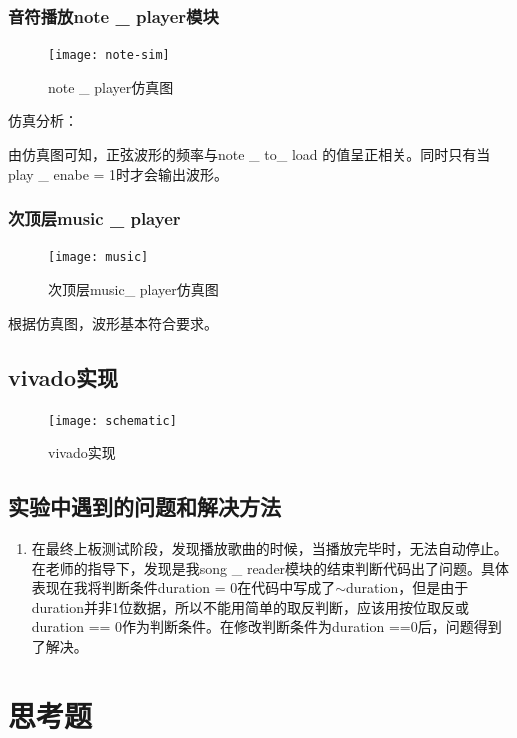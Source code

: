 \documentclass{../source/Experiment}
\begin{document}
            \subsubsection{音符播放note \_ player模块}
                \begin{figure}[H]
                    \centering
                    \texttt{[image: note-sim]}
                    \caption{note \_ player仿真图}
                \end{figure}

            仿真分析：
            
            由仿真图可知，正弦波形的频率与note \_ to\_ load 的值呈正相关。同时只有当play \_ enabe = 1时才会输出波形。

            \subsubsection{次顶层music \_ player}
                \begin{figure}[H]
                    \centering
                    \texttt{[image: music]}
                    \caption{次顶层music\_ player仿真图}
                \end{figure}
            根据仿真图，波形基本符合要求。

        \subsection{vivado实现}
            \begin{figure}[H]
                \centering
                \texttt{[image: schematic]}
                \caption{vivado实现}
            \end{figure}
        \subsection{实验中遇到的问题和解决方法}
            \begin{enumerate}
                \item 在最终上板测试阶段，发现播放歌曲的时候，当播放完毕时，无法自动停止。在老师的指导下，发现是我song \_ reader模块的结束判断代码出了问题。具体表现在我将判断条件duration = 0在代码中写成了$\sim$duration，但是由于duration并非1位数据，所以不能用简单的取反判断，应该用按位取反或duration == 0作为判断条件。在修改判断条件为duration ==0后，问题得到了解决。
            \end{enumerate}
    \section{思考题}
\end{document}
